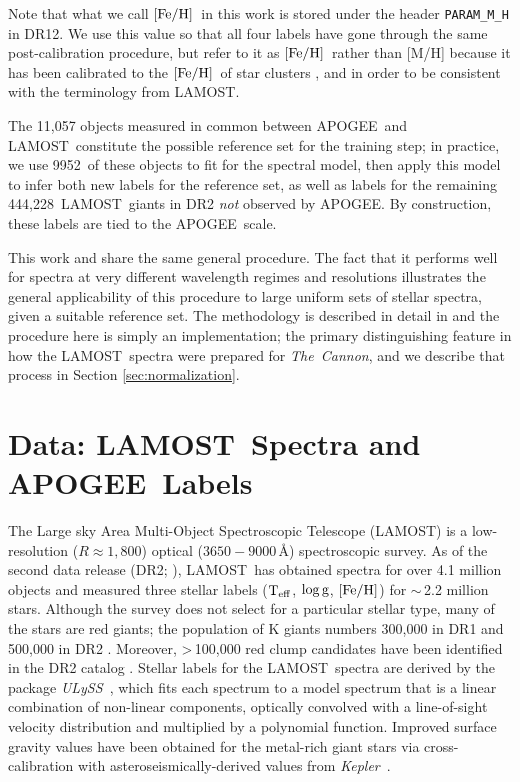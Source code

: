 \documentclass[12pt, letterpaper, preprint]{aastex}
\newcommand{\tc}{\textsl{The~Cannon}}
\newcommand{\apogee}{APOGEE}
\newcommand{\lamost}{LAMOST}
\newcommand{\kepler}{\textsl{Kepler}}
\newcommand{\ulyss}{\textsl{ULySS}}
\newcommand{\teff}{\mbox{$\rm T_{eff}$}}
\newcommand{\feh}{\mbox{$\rm [Fe/H]$}}
\newcommand{\logg}{\mbox{$\rm \log g$}}
\newcommand{\angstrom}{\mbox{\AA}}
\newcommand{\ntrobj}{9952}
\newcommand{\ntestobj}{444,228}
\begin{document}
Note that what we call \feh\ in this work is stored under the header \texttt{PARAM\_M\_H} in DR12. 
We use this value so that all four labels have gone through the same post-calibration procedure, but refer to it as \feh\ rather than [M/H] because it has been calibrated to the \feh\ of star clusters \citep{Meszaros2013}, and in order to be consistent with the terminology
from \lamost.

The 11,057 objects measured in common between \apogee\ and \lamost\ constitute the possible reference set for the training step;
in practice, we use \ntrobj\ of these objects to fit for 
the spectral model, then apply this model 
to infer both new labels for the reference set,
as well as labels for the remaining 
\ntestobj\ \lamost\ giants in DR2 \emph{not} observed by \apogee.
By construction, these labels are tied to the \apogee\ scale.

This work and \citet{Ness2015} share the same general procedure.
The fact that it performs well for spectra at very different wavelength regimes and resolutions illustrates the general applicability of this procedure to large uniform sets of stellar spectra, given a suitable reference set.
The methodology is described in detail in \citet{Ness2015} and the
procedure here is simply an implementation;
the primary distinguishing feature
in how the \lamost\ spectra were prepared for \tc,
and we describe that process in Section \ref{sec:normalization}.

\section{Data: \lamost\ Spectra and \apogee\ Labels}\label{sec:data}

The Large sky Area Multi-Object Spectroscopic Telescope (\lamost) 
is a low-resolution ($R\approx1,800$) optical ($3650-9000\,\angstrom$) spectroscopic survey.
As of the second data release (DR2; \citet{Luo2015}), \lamost\ has 
obtained spectra for over 4.1 million objects and 
measured three stellar labels (\teff, \logg, \feh) for
 $\sim\,$2.2 million stars. 
Although the survey does not select for
a particular stellar type, many of the stars
are red giants; the population of K giants
numbers 300,000 in DR1 and 500,000 in DR2
\citep{Liu2014}. 
Moreover, \textgreater\,100,000 red clump candidates have been identified in the DR2 catalog \citep{Wan2015}.
Stellar labels for the \lamost\ spectra 
are derived by
the package \ulyss\ \citep{Wu2011}, which fits each spectrum to a 
model spectrum that is a linear combination of non-linear components,
optically convolved with a line-of-sight velocity
distribution and multiplied by a polynomial function. 
Improved surface gravity values have been obtained for
the metal-rich giant stars via cross-calibration with asteroseismically-derived values from
\kepler\ \citep{Liu2015}.
\end{document}
